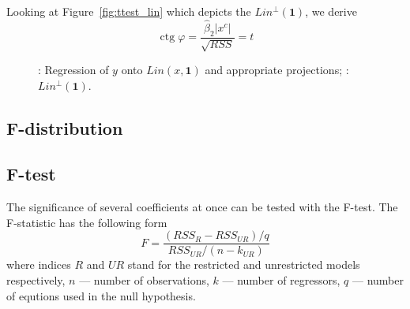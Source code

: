 \documentclass[nobib]{tufte-handout}
\DeclareMathOperator{\ctg}{ctg}
\theoremstyle{definition}
\begin{document}
Looking at Figure~\ref{fig:ttest_lin} which depicts the $Lin^{\perp}(\mathbf{1})$,
we derive
\[
\ctg \varphi = \frac{\hat \beta_2 \vert x^c \vert}{\sqrt{RSS}} = t
\]

\begin{figure}[ht!]
\begin{center}
\caption{: Regression of $y$ onto $Lin(x, \mathbf{1})$ and appropriate projections;
: $Lin^{\perp}(\mathbf{1})$.}
\end{center}
\end{figure}

\subsection{F-distribution}

\subsection{F-test}

The significance of several coefficients at once can be tested with the F-test.
The F-statistic has the following form
\[
F = \frac{(RSS_{R} - RSS_{UR})/q}{RSS_{UR}/(n-k_{UR})}
\]
where indices $R$ and $UR$ stand for the restricted and unrestricted models
respectively, $n$ — number of observations, $k$ — number of regressors,
$q$ — number of equtions used in the null hypothesis.
\end{document}
